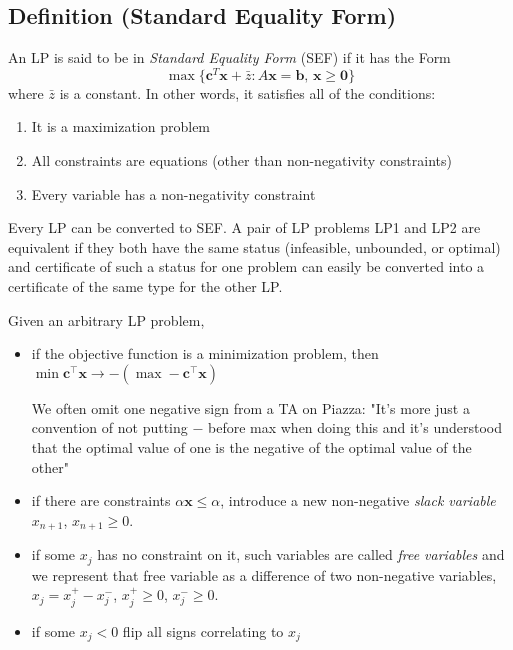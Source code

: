 \begin{defbox}
    \subsection{Definition (Standard Equality Form)}
    An LP is said to be in \emph{Standard Equality Form} (SEF) if it has the Form
    \[ \max \{\bm{c}^T \bm{x}+\bar{z} : A \bm{x}=\bm{b},\,\bm{x}\ge \bm{0}\}\]
    where $ \bar{z} $ is a constant.
    In other words, it satisfies all of the conditions:
    \begin{enumerate}[(1)]
        \item It is a maximization problem
        \item All constraints are equations (other than non-negativity
        constraints)
        \item Every variable has a non-negativity constraint
    \end{enumerate}
\end{defbox}
Every LP can be converted to SEF. A pair of LP problems LP1 and LP2 are equivalent if they both have the
same status (infeasible, unbounded, or optimal) and certificate of such a status for one problem can easily
be converted into a certificate of the same type for the other LP.

Given an arbitrary LP problem, 
\begin{itemize}
    \item if the objective function is a minimization problem, then 
    $\min \bm{c}^\top \bm{x}\rightarrow -(\max -\bm{c}^\top \bm{x})$
        \begin{remark}
        We often omit one negative sign
        from a TA on Piazza: "It's more just a convention of not putting $ - $
        before max when doing this and it's understood that the 
        optimal value of one is the negative of the optimal value of the other"
        \end{remark} 
    \item if there are constraints $\alpha\bm{x}\le \alpha$, introduce a new
    non-negative \emph{slack variable} $x_{n+1}$, $x_{n+1}\ge 0$.
    \item if some $x_j$ has no constraint on it, such variables are called \emph{free variables} and
    we represent that free variable as a difference of two non-negative variables,
    $x_j=x_j^+-x_j^-$, $x_j^+\ge 0$, $x_j^-\ge 0$.
    \item if some $x_j<0$ flip all signs correlating to $x_j$
\end{itemize}

